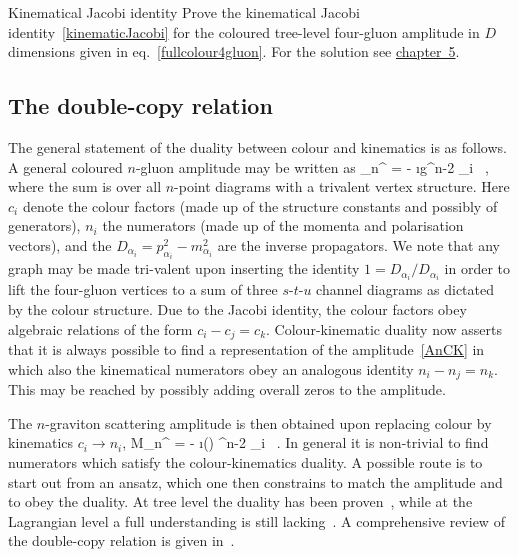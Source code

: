 \begin{exer}{Kinematical Jacobi identity}
\label{Ex:2.kin_Jacobi}
Prove the kinematical Jacobi identity~\eqref{kinematicJacobi} for the coloured tree-level four-gluon amplitude in $D$ dimensions given in eq.~\eqref{fullcolour4gluon}. 
For the solution see \hyperref[Sol:2.kin_Jacobi]{chapter~5}.
\end{exer}


\subsection{The double-copy relation}

The general statement of the duality between colour and kinematics is as follows. A general coloured
$n$-gluon amplitude may be written as
%
\be
\label{AnCK}
_{n}^{} = - \i g^{n-2} \sum_{i} \, ,
\ee
%
where the sum is over all $n$-point diagrams with a trivalent vertex structure. 
Here $c_{i}$ denote the colour factors (made up of the structure constants and possibly of generators),
$n_{i}$ the numerators (made up of the momenta and polarisation vectors), and the $D_{\alpha_{i}}=p_{\alpha_{i}}^{2}-m_{\alpha_{i}}^{2}$ are the inverse propagators.
We note that any graph may be made tri-valent upon inserting the identity $1= D_{\alpha_{i}}/D_{\alpha_{i}}$
in order to lift  the four-gluon vertices to a sum of three  $s$-$t$-$u$ channel diagrams as dictated by the colour structure. Due to the Jacobi identity, the colour factors obey algebraic relations
of the form $c_{i}-c_{j}=c_{k}$. Colour-kinematic duality now asserts that it is always possible to
find a representation of the amplitude~\eqref{AnCK} in which also the kinematical numerators obey
an analogous identity $n_{i}-n_{j}=n_{k}$. This may be reached by possibly adding overall
zeros to the amplitude.

The $n$-graviton scattering amplitude is then obtained upon replacing colour by kinematics
$c_{i}\to n_{i}$,
%
\be
M_{n}^{} = - \i \left (\right) ^{n-2} \sum_{i} \, .
\ee
%
In general it is non-trivial to find numerators which satisfy the colour-kinematics duality. A possible route
is to start out from an ansatz, which one then constrains to match the amplitude and to obey the duality. 
At tree level the duality has been proven~\cite{ch2_Bjerrum-Bohr:2010pnr,ch2_Bern:2010yg,ch2_Bjerrum-Bohr:2016axv}, while at the Lagrangian level a full understanding
is still lacking~\cite{ch2_Bern:2010yg,ch2_Tolotti:2013caa,ch2_Bonezzi:2022bse}. A comprehensive review of the double-copy relation is given in~\cite{ch2_Bern:2019prr}.


